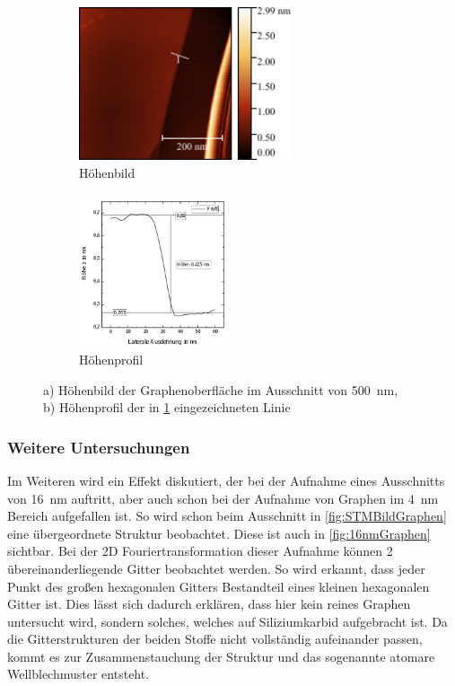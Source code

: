 \documentclass[a4paper,twoside,final]{article}
\begin{document}
\begin{figure}[h]
    \centering
    \begin{subfigure}{0.45\textwidth}
        \includegraphics[height=4.5cm]{Bilder/Image02125_Kantenmessung_Graphen_richtig_mitLinie.pdf}
        \caption{Höhenbild}
        \label{fig:Kante}
    \end{subfigure}
    \hspace{0.5cm}
    \begin{subfigure}{0.45\textwidth}
        \includegraphics[height=4.5cm]{Bilder/Graphen_Kante.pdf}
        \caption{Höhenprofil}
        \label{fig:KanteHöhe}
    \end{subfigure}
    \caption{a) Höhenbild der Graphenoberfläche im Ausschnitt von \SI{500}{\nano\meter},\\
    b) Höhenprofil der in \ref{fig:Kante} eingezeichneten Linie}
\end{figure}
\FloatBarrier

\subsubsection{Weitere Untersuchungen}
Im Weiteren wird ein Effekt diskutiert, der bei der Aufnahme eines Ausschnitts von \SI{16}{\nano\meter} auftritt, aber auch schon bei der Aufnahme von Graphen im \SI{4}{\nano\meter} Bereich aufgefallen ist. So wird schon beim Ausschnitt in \ref{fig:STMBildGraphen} eine übergeordnete Struktur beobachtet. Diese ist auch in \ref{fig:16nmGraphen} sichtbar. Bei der 2D Fouriertransformation dieser Aufnahme können 2 übereinanderliegende Gitter beobachtet werden. So wird erkannt, dass jeder Punkt des großen hexagonalen Gitters Bestandteil eines kleinen hexagonalen Gitter ist. Dies lässt sich dadurch erklären, dass hier kein reines Graphen untersucht wird, sondern solches, welches auf Siliziumkarbid aufgebracht ist. Da die Gitterstrukturen der beiden Stoffe nicht vollständig aufeinander passen, kommt es zur Zusammenstauchung der Struktur und das sogenannte atomare Wellblechmuster entsteht. \\
\end{document}
